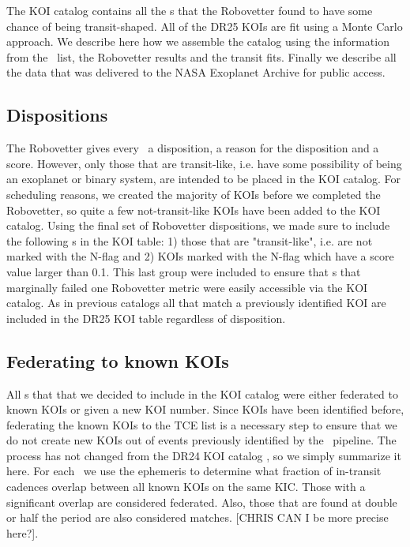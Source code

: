 The KOI catalog contains all the \opstce s that the Robovetter found to have some chance of being transit-shaped. All of the DR25 KOIs are fit using a Monte Carlo approach. We describe here how we assemble the catalog using the information from the \opstce\ list, the Robovetter results and the transit fits. Finally we describe all the data that was delivered to the NASA Exoplanet Archive for public access.
\label{koisec}

\subsection{Dispositions}
The Robovetter gives every \opstce\ a disposition, a reason for the disposition and a score.  However, only those that are transit-like, i.e. have some possibility of being an exoplanet or binary system, are intended to be placed in the KOI catalog. For scheduling reasons, we created the majority of KOIs before we completed the Robovetter, so quite a few not-transit-like KOIs have been added to the KOI catalog. Using the final set of Robovetter dispositions, we made sure to include the following \opstce s in the KOI table: 1) those that are "transit-like", i.e. are not marked with the N-flag and 2) KOIs marked with the N-flag which have a score value larger than 0.1.  This last group were included to ensure that \opstce s that marginally failed one Robovetter metric were easily accessible via the KOI catalog. As in previous catalogs all  that match a previously identified KOI are included in the DR25 KOI table regardless of disposition.


\subsection{Federating to known KOIs}
All \opstce s that that we decided to include in the KOI catalog were either federated to known KOIs or given a new KOI number. Since KOIs have been identified before, federating the known KOIs to the TCE list is a necessary step to ensure that we do not create new KOIs out of events previously identified by the \Kepler\ pipeline.  The process has not changed from the  DR24 KOI catalog \citep{Coughlin2016}, so we simply summarize it here.  For each \opstce\ we use the ephemeris to determine what fraction of in-transit cadences overlap between all known KOIs on the same KIC.  Those with a significant overlap are considered federated.     Also, those that are found at double or half the period are also considered matches.  [CHRIS CAN I be more precise here?].

